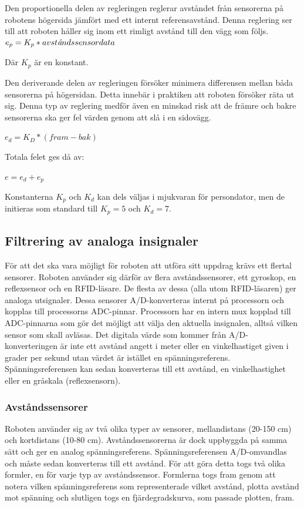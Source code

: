 \documentclass[a4paper,12pt,fleqn]{article}
\begin{document}
Den proportionella delen av regleringen reglerar avståndet från sensorerna på robotens högersida jämfört med ett internt referensavstånd. Denna reglering ser till att roboten håller sig inom ett rimligt avstånd till den vägg som följs.
$ e_p = K_{p}*avst\text{\it{å}}ndssensordata $

Där $K_{p}$ är en konstant.

Den deriverande delen av regleringen försöker minimera differensen mellan båda sensorerna på högersidan. Detta innebär i praktiken att roboten försöker räta ut sig. Denna typ av reglering medför även en minskad risk att de främre och bakre sensorerna ska ger fel värden genom att slå i en sidovägg.


$ e_d = K_{D}*(fram - bak) $

Totala felet ges då av: 

$e = e_d + e_p$

Konstanterna $K_{p}$ och $K_{d}$ kan dels väljas i mjukvaran för persondator, men de initieras som standard till $K_{p}=5$ och $K_{d}=7$.


\newpage

\subsection{Filtrering av analoga insignaler}
För att det ska vara möjligt för roboten att utföra sitt uppdrag krävs ett flertal sensorer. Roboten använder sig därför av flera avståndssensorer, ett gyroskop, en reflexsensor och en RFID-läsare. De flesta av dessa (alla utom RFID-läsaren) ger analoga utsignaler. Dessa sensorer A/D-konverteras internt på processorn och kopplas till processorns ADC-pinnar. Processorn har en intern mux kopplad till ADC-pinnarna som gör det möjligt att välja den aktuella insignalen, alltså vilken sensor som skall avläsas. Det digitala värde som kommer från A/D-konverteringen är inte ett avstånd angett i meter eller en vinkelhastiget given i grader per sekund utan värdet är istället en spänningsreferens. Spänningsreferensen kan sedan konverteras till ett avstånd, en vinkelhastighet eller en gråskala (reflexsensorn).

\subsubsection{Avståndssensorer}
Roboten använder sig av två olika typer av sensorer, mellandistans (20-150 cm) och kortdistans (10-80 cm). Avståndssensorerna är dock uppbyggda på samma sätt och ger en analog spänningsreferens. Spänningsreferensen A/D-omvandlas och måste sedan konverteras till ett avstånd. För att göra detta togs två olika formler, en för varje typ av avståndssensor. Formlerna togs fram genom att notera vilken spänningsreferens som representerade vilket avstånd, plotta avstånd mot spänning och slutligen togs en fjärdegradskurva, som passade plotten, fram. 
\end{document}

